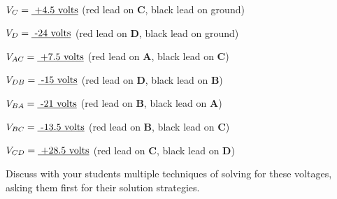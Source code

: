 $V_C = \hbox{\underbar{ +4.5 volts}}$ (red lead on {\bf C}, black lead on ground)

\vskip 5pt

$V_D = \hbox{\underbar{ -24 volts}}$ (red lead on {\bf D}, black lead on ground)

\vskip 20pt

\goodbreak

$V_{AC} = \hbox{\underbar{ +7.5 volts}}$ (red lead on {\bf A}, black lead on {\bf C})

\vskip 5pt

$V_{DB} = \hbox{\underbar{ -15 volts}}$ (red lead on {\bf D}, black lead on {\bf B})

\vskip 5pt

$V_{BA} = \hbox{\underbar{ -21 volts}}$ (red lead on {\bf B}, black lead on {\bf A})

\vskip 5pt

$V_{BC} = \hbox{\underbar{ -13.5 volts}}$ (red lead on {\bf B}, black lead on {\bf C})

\vskip 5pt

$V_{CD} = \hbox{\underbar{ +28.5 volts}}$ (red lead on {\bf C}, black lead on {\bf D})








Discuss with your students multiple techniques of solving for these voltages, asking them first for their solution strategies.




